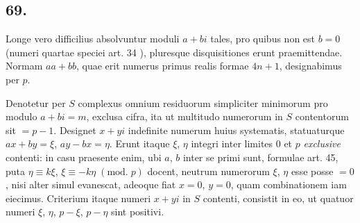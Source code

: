 \documentclass[twoside,12pt]{memoir}
\renewcommand{\pmod}[1]{\;(\textrm{mod.}\;#1)}
\begin{document}
\subsection*{69.}
 
Longe vero difficilius absolvuntur moduli \(a+b i\) tales, pro quibus non est \(b=0\) (numeri quartae speciei art. 34 ), pluresque disquisitiones erunt praemittendae. Normam \(a a+b b\), quae erit numerus primus realis formae \(4 n+1\), designabimus per \(p\).
 
Denotetur per \({S}\) complexus omnium residuorum simpliciter minimorum pro modulo \(a+b i=m\), exclusa cifra, ita ut multitudo numerorum in \(S\) contentorum sit \(=p-1\). Designet \(x+y i\) indefinite numerum huius systematis, statuaturque \(a x+b y=\xi\), \(a y-b x=\eta\). Erunt itaque \(\xi\), \(\eta\) integri inter limites \(0\) et \(p\) \textit{exclusive} contenti: in casu praesente enim, ubi \(a\), \(b\) inter se primi sunt, formulae art. 45, puta \(\eta \equiv k \xi\), \(\xi \equiv-k \eta\pmod{p}\) docent, neutrum numerorum \(\xi\), \(\eta\) esse posse \(=0\), nisi alter simul evanescat, adeoque fiat \(x=0\), \(y=0\), quam combinationem iam eiecimus. Criterium itaque numeri \(x+y i\) in \(S\) contenti, consistit in eo, ut quatuor numeri \(\xi\), \(\eta\), \(p-\xi\), \(p-\eta\) sint positivi.
\end{document}
